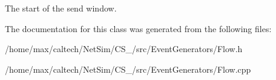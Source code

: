 \-The start of the send window. 



\-The documentation for this class was generated from the following files\-:\begin{DoxyCompactItemize}
\item 
/home/max/caltech/\-Net\-Sim/\-C\-S\-\_/src/\-Event\-Generators/\-Flow.\-h\item 
/home/max/caltech/\-Net\-Sim/\-C\-S\-\_/src/\-Event\-Generators/\-Flow.\-cpp\end{DoxyCompactItemize}
